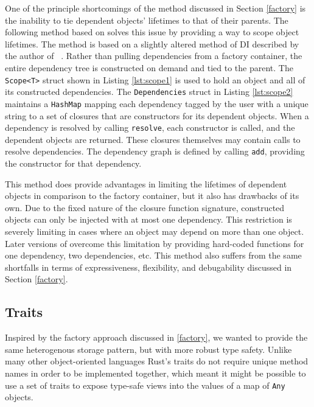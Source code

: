 \documentclass[sigconf]{acmart}
\def\code#1{\lstinline{#1}}
\begin{document}
One of the principle shortcomings of the method discussed in Section \ref{factory} is the inability to tie dependent objects' lifetimes to that of their parents. The following method based on \cite{di-rs} solves this issue by providing a way to scope object lifetimes. The method is based on a slightly altered method of DI described by the author of \cite{di-rs}~\cite{inceptor}. Rather than pulling dependencies from a factory container, the entire dependency tree is constructed on demand and tied to the parent. The \lstinline{Scope<T>} struct shown in Listing \ref{lst:scope1} is used to hold an object and all of its constructed dependencies. The \lstinline{Dependencies} struct in Listing \ref{lst:scope2} maintains a \lstinline{HashMap} mapping each dependency tagged by the user with a unique string to a set of closures that are constructors for its dependent objects. When a dependency is resolved by calling \lstinline{resolve}, each constructor is called, and the dependent objects are returned. These closures themselves may contain calls to resolve dependencies. The dependency graph is defined by calling \lstinline{add}, providing the constructor for that dependency.

\begin{minipage}{\linewidth}

\end{minipage}



This method does provide advantages in limiting the lifetimes of dependent objects in comparison to the factory container, but it also has drawbacks of its own. Due to the fixed nature of the closure function signature, constructed objects can only be injected with at most one dependency. This restriction is severely limiting in cases where an object may depend on more than one object. Later versions of \cite{di-rs} overcome this limitation by providing hard-coded functions for one dependency, two dependencies, etc. This method also suffers from the same shortfalls in terms of expressiveness, flexibility, and debugability discussed in Section \ref{factory}.

\subsection{Traits}

Inspired by the factory approach discussed in \ref{factory}, we wanted to provide the same heterogenous storage pattern, but with more robust type safety. Unlike many other object-oriented languages Rust's traits do not require unique method names in order to be implemented together, which meant it might be possible to use a set of traits to expose type-safe views into the values of a map of \code{Any} objects.
\end{document}
